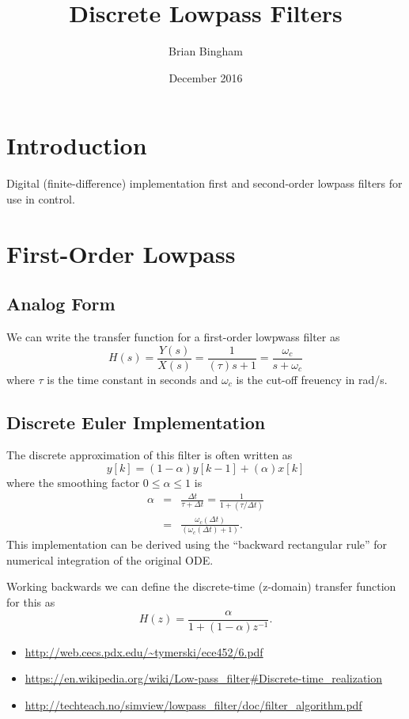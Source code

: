 \documentclass[12pt, letterpaper]{article}
\title{Discrete Lowpass Filters}
\author{Brian Bingham}%
\date{December 2016}
\begin{document}
\maketitle

\section*{Introduction}
Digital (finite-difference) implementation first and second-order lowpass filters for use in control.

\section{First-Order Lowpass}
\subsection{Analog Form}
We can write the transfer function for a first-order lowpwass filter as
\[
H(s) = \frac{Y(s)}{X(s)} = \frac{1}{(\tau)s +1} = \frac{\omega_c}{s+\omega_c}
\]
where $\tau$ is the time constant in seconds and $\omega_c$ is the cut-off freuency in rad/s.
\subsection{Discrete Euler Implementation}
The discrete approximation of this filter is often written as
\[
y[k] = (1-\alpha) y[k-1] + (\alpha) x[k]
\]
where the smoothing factor $0 \leq \alpha \leq 1$ is
\begin{eqnarray*}
\alpha & = & \frac{\Delta t}{\tau + \Delta t} = \frac{1}{1+(\tau / \Delta t)}\\
       & = & \frac{\omega_c (\Delta t)}{(\omega_c (\Delta t)+1)}.
\end{eqnarray*}
This implementation can be derived using the ``backward rectangular rule'' for numerical integration of the original ODE.


Working backwards we can define the discrete-time (z-domain) transfer function for this as
\[
H(z) = \frac{\alpha}{1 + (1-\alpha)z^{-1}}.
\]

\begin{itemize}
\item \url{http://web.cecs.pdx.edu/~tymerski/ece452/6.pdf}
\item \url{https://en.wikipedia.org/wiki/Low-pass_filter#Discrete-time_realization}
\item \url{http://techteach.no/simview/lowpass_filter/doc/filter_algorithm.pdf}
\end{itemize}
\end{document}
